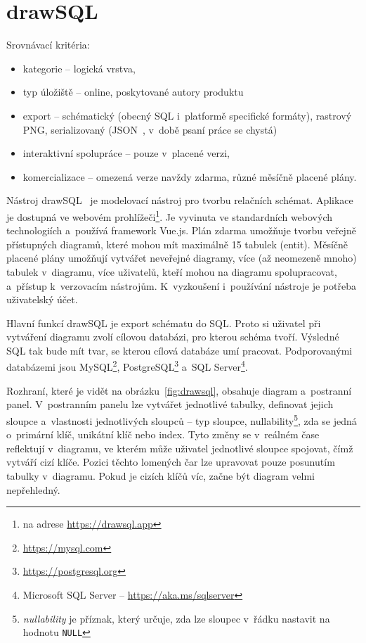 \section{drawSQL}

Srovnávací kritéria:
\begin{itemize}
  \item kategorie -- logická vrstva,
  \item typ úložiště -- online, poskytované autory produktu
  \item export -- schématický (obecný SQL i~platformě specifické formáty),
  rastrový PNG, serializovaný (JSON~\cite{json2017}, v~době psaní práce se
  chystá)
  \item interaktivní spolupráce -- pouze v~placené verzi,
  \item komercializace -- omezená verze navždy zdarma, různé měsíčně placené
  plány.
\end{itemize}

Nástroj drawSQL~\cite{drawsql21} je modelovací nástroj pro tvorbu relačních
schémat. Aplikace je dostupná ve webovém prohlížeči\footnote{na adrese
\url{https://drawsql.app}}. Je vyvinuta ve standardních webových technologiích
a~používá framework Vue.js. Plán zdarma umožňuje tvorbu veřejně přístupných
diagramů, které mohou mít maximálně 15 tabulek (entit). Měsíčně placené plány
umožňují vytvářet neveřejné diagramy, více (až neomezeně mnoho) tabulek
v~diagramu, více uživatelů, kteří mohou na diagramu spolupracovat, a~přístup
k~verzovacím nástrojům. K~vyzkoušení i~používání nástroje je potřeba uživatelský
účet.

Hlavní funkcí drawSQL je export schématu do SQL. Proto si uživatel při vytváření
diagramu zvolí cílovou databázi, pro kterou schéma tvoří. Výsledné SQL tak bude
mít tvar, se kterou cílová databáze umí pracovat. Podporovanými databázemi jsou
MySQL\footnote{\url{https://mysql.com}},
PostgreSQL\footnote{\url{https://postgresql.org}} a~SQL
Server\footnote{Microsoft SQL Server -- \url{https://aka.ms/sqlserver}}.

Rozhraní, které je vidět na obrázku~\ref{fig:drawsql}, obsahuje diagram
a~postranní panel. V~postranním panelu lze vytvářet jednotlivé tabulky,
definovat jejich sloupce a~vlastnosti jednotlivých sloupců -- typ sloupce,
nullability\footnote{\emph{nullability} je příznak, který určuje, zda lze sloupec
v~řádku nastavit na hodnotu \texttt{NULL}}, zda se jedná o~primární klíč, unikátní klíč
nebo index. Tyto změny se v~reálném čase reflektují v~diagramu, ve kterém může
uživatel jednotlivé sloupce spojovat, čímž vytváří cizí klíče. Pozici těchto
lomených čar lze upravovat pouze posunutím tabulky v~diagramu. Pokud je cizích
klíčů víc, začne být diagram velmi nepřehledný.

